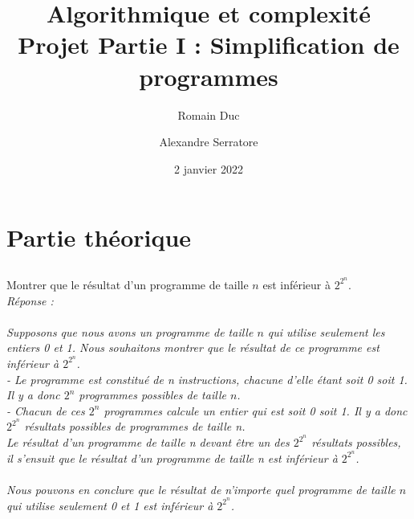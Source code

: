 \documentclass[a4paper,11pt]{article}
\title{Algorithmique et complexité Projet Partie I : Simplification de programmes}
\author{Romain Duc \and Alexandre Serratore}
\date{2 janvier 2022}
\begin{document}
    
    \maketitle
    \newpage
    \setcounter{section}{3}
    \section{Partie théorique}
    
	\setcounter{subsection}{5}
        \subsection{}\label{subsec:Q6}
        Montrer que le résultat d'un programme de taille $n$ est inférieur à $2^{2^{n}}$.\\
		\textit{ Réponse : \\\\
		Supposons que nous avons un programme de taille $n$ qui utilise seulement les entiers 0 et 1. Nous souhaitons montrer que le résultat de ce programme est inférieur à $2^{2^{n}}$.\\
- Le programme est constitué de n instructions, chacune d'elle étant soit 0 soit 1. Il y a donc $2^n$ programmes possibles de taille $n$.\\
- Chacun de ces $2^n$ programmes calcule un entier qui est soit 0 soit 1. Il y a donc $2^{2^{n}}$ résultats possibles de programmes de taille n.\\
Le résultat d'un programme de taille n devant être un des $2^{2^{n}}$ résultats possibles, il s'ensuit que le résultat d'un programme de taille n est inférieur à $2^{2^{n}}$.\\\\
Nous pouvons en conclure que le résultat de n'importe quel programme de taille $n$ qui utilise seulement 0 et 1 est inférieur à $2^{2^{n}}$.}
\end{document}

